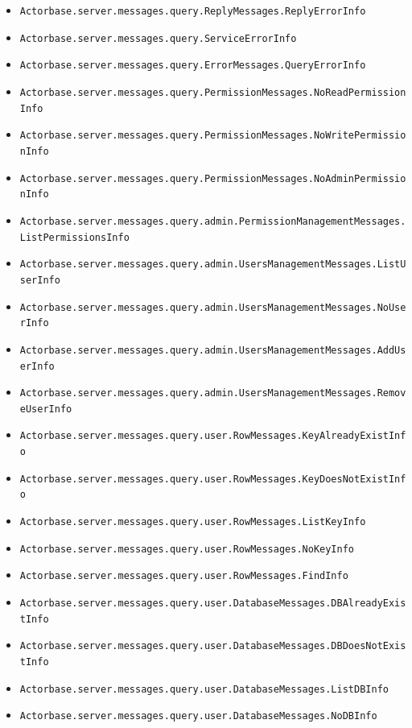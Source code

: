 \documentclass[a4paper]{article}
\begin{document}
			\begin{itemize}
				\item \texttt{Actorbase.server.messages.query.ReplyMessages.ReplyErrorInfo }
				\item \texttt{Actorbase.server.messages.query.ServiceErrorInfo }
				\item \texttt{Actorbase.server.messages.query.ErrorMessages.QueryErrorInfo }
				\item \texttt{Actorbase.server.messages.query.PermissionMessages.NoReadPermissionInfo }
  				\item \texttt{Actorbase.server.messages.query.PermissionMessages.NoWritePermissionInfo }
  				\item \texttt{Actorbase.server.messages.query.PermissionMessages.NoAdminPermissionInfo }
  				\item \texttt{Actorbase.server.messages.query.admin.PermissionManagementMessages.ListPermissionsInfo }
  				\item \texttt{Actorbase.server.messages.query.admin.UsersManagementMessages.ListUserInfo }
  				\item \texttt{Actorbase.server.messages.query.admin.UsersManagementMessages.NoUserInfo }
  				\item \texttt{Actorbase.server.messages.query.admin.UsersManagementMessages.AddUserInfo }
  				\item \texttt{Actorbase.server.messages.query.admin.UsersManagementMessages.RemoveUserInfo }
  				\item \texttt{Actorbase.server.messages.query.user.RowMessages.KeyAlreadyExistInfo }
  				\item \texttt{Actorbase.server.messages.query.user.RowMessages.KeyDoesNotExistInfo }
  				\item \texttt{Actorbase.server.messages.query.user.RowMessages.ListKeyInfo }
  				\item \texttt{Actorbase.server.messages.query.user.RowMessages.NoKeyInfo }
  				\item \texttt{Actorbase.server.messages.query.user.RowMessages.FindInfo }
  				\item \texttt{Actorbase.server.messages.query.user.DatabaseMessages.DBAlreadyExistInfo }
  				\item \texttt{Actorbase.server.messages.query.user.DatabaseMessages.DBDoesNotExistInfo }
  				\item \texttt{Actorbase.server.messages.query.user.DatabaseMessages.ListDBInfo }
  				\item \texttt{Actorbase.server.messages.query.user.DatabaseMessages.NoDBInfo }

\end{itemize}
\end{document}
